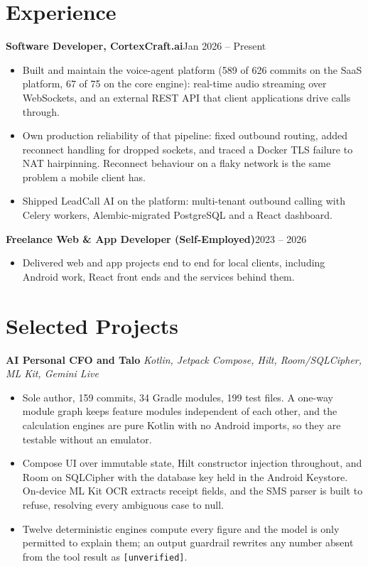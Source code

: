 \documentclass[10pt,a4paper]{article}
\newcommand{\entry}[2]{\textbf{#1}\hfill{#2}\par}
\begin{document}
\section{Experience}
\entry{Software Developer, CortexCraft.ai}{Jan 2026 -- Present}
\begin{itemize}
  \item Built and maintain the voice-agent platform (589 of 626 commits on the SaaS platform, 67 of 75
        on the core engine): real-time audio streaming over WebSockets, and an external REST API that
        client applications drive calls through.
  \item Own production reliability of that pipeline: fixed outbound routing, added reconnect handling
        for dropped sockets, and traced a Docker TLS failure to NAT hairpinning. Reconnect behaviour
        on a flaky network is the same problem a mobile client has.
  \item Shipped LeadCall AI on the platform: multi-tenant outbound calling with Celery workers,
        Alembic-migrated PostgreSQL and a React dashboard.
\end{itemize}

\vspace{1pt}
\entry{Freelance Web \& App Developer (Self-Employed)}{2023 -- 2026}
\begin{itemize}
  \item Delivered web and app projects end to end for local clients, including Android work, React front ends and the services behind them.
\end{itemize}

\section{Selected Projects}
\textbf{AI Personal CFO and Talo} \textit{Kotlin, Jetpack Compose, Hilt, Room/SQLCipher, ML Kit, Gemini Live}
\begin{itemize}
  \item Sole author, 159 commits, 34 Gradle modules, 199 test files. A one-way module graph keeps
        feature modules independent of each other, and the calculation engines are pure Kotlin with
        no Android imports, so they are testable without an emulator.
  \item Compose UI over immutable state, Hilt constructor injection throughout, and Room on SQLCipher
        with the database key held in the Android Keystore. On-device ML Kit OCR extracts receipt
        fields, and the SMS parser is built to refuse, resolving every ambiguous case to null.
  \item Twelve deterministic engines compute every figure and the model is only permitted to explain
        them; an output guardrail rewrites any number absent from the tool result as
        \texttt{[unverified]}.
\end{itemize}
\end{document}
